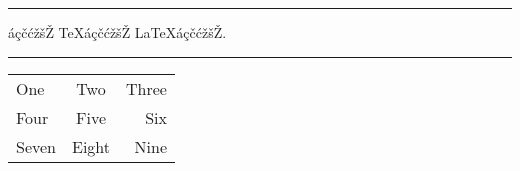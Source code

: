 \documentclass{article}
\begin{document}
\START
\hrule\bigskip

\begin{codehigh}
áçčćžšŽ \TeX áçčćžšŽ \LaTeX áçčćžšŽ.
\end{codehigh}
\ENDTEST

\bigskip\hrule\bigskip

\begin{codehigh*}[language=latex/table]
\begin{tabular}[b]{|lc|r|}
\hline
One   &  Two  & Three \\
Four  & Five  &   Six \\
\hline%
Seven & Eight &  Nine \\
\hline
\end{tabular}
\end{codehigh*}
\ENDTEST
\end{document}
